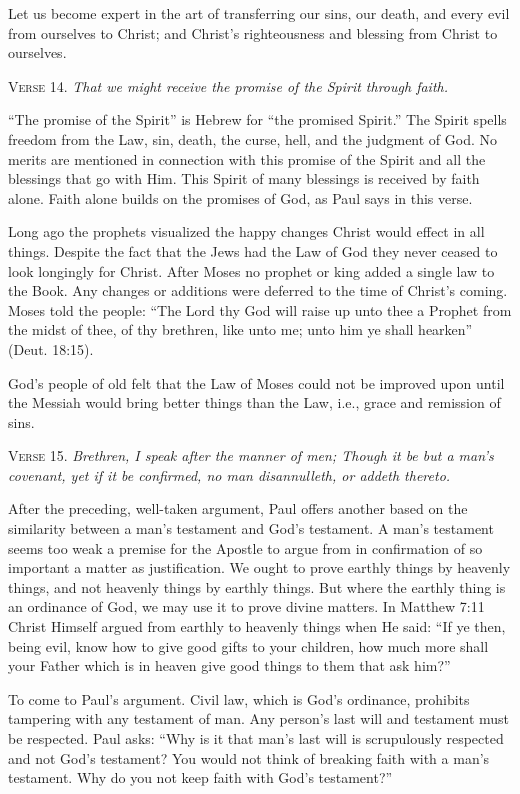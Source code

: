 Let us become expert in the art of transferring our sins, our death, and every evil from ourselves to Christ; and Christ’s righteousness and blessing from Christ to ourselves.

\textsc{Verse} 14. \emph{That we might receive the promise of the Spirit through faith.}

“The promise of the Spirit” is Hebrew for “the promised Spirit.” The Spirit spells freedom from the Law, sin, death, the curse, hell, and the judgment of God. No merits are mentioned in connection with this promise of the Spirit and all the blessings that go with Him. This Spirit of many blessings is received by faith alone. Faith alone builds on the promises of God, as Paul says in this verse.

Long ago the prophets visualized the happy changes Christ would effect in all things. Despite the fact that the Jews had the Law of God they never ceased to look longingly for Christ. After Moses no prophet or king added a single law to the Book. Any changes or additions were deferred to the time of Christ’s coming. Moses told the people: “The Lord thy God will raise up unto thee a Prophet from the midst of thee, of thy brethren, like unto me; unto him ye shall hearken” (Deut. 18:15).

God’s people of old felt that the Law of Moses could not be improved upon until the Messiah would bring better things than the Law, i.e., grace and remission of sins.

\textsc{Verse} 15. \emph{Brethren, I speak after the manner of men; Though it be but a man’s covenant, yet if it be confirmed, no man disannulleth, or addeth thereto.}

After the preceding, well-taken argument, Paul offers another based on the similarity between a man’s testament and God’s testament. A man’s testament seems too weak a premise for the Apostle to argue from in confirmation of so important a matter as justification. We ought to prove earthly things by heavenly things, and not heavenly things by earthly things. But where the earthly thing is an ordinance of God, we may use it to prove divine matters. In Matthew 7:11 Christ Himself argued from earthly to heavenly things when He said: “If ye then, being evil, know how to give good gifts to your children, how much more shall your Father which is in heaven give good things to them that ask him?”

To come to Paul’s argument. Civil law, which is God’s ordinance, prohibits tampering with any testament of man. Any person’s last will and testament must be respected. Paul asks: “Why is it that man’s last will is scrupulously respected and not God’s testament? You would not think of breaking faith with a man’s testament. Why do you not keep faith with God’s testament?”

